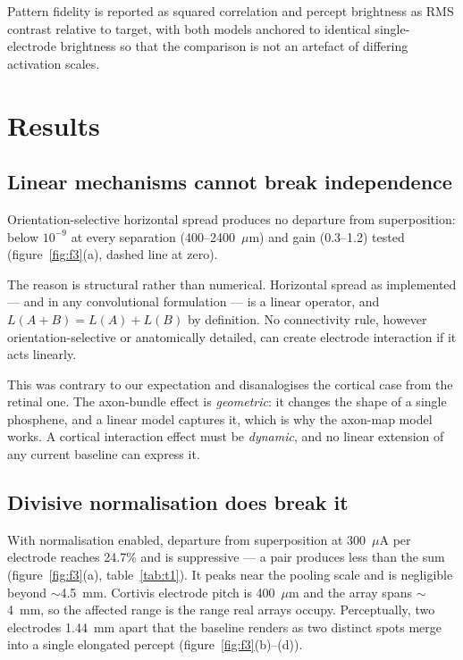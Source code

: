 \documentclass[10pt,twocolumn]{article}
\newcommand{\um}{\ensuremath{\mu\text{m}}}
\newcommand{\uA}{\ensuremath{\mu\text{A}}}
\begin{document}
Pattern fidelity is reported as squared correlation and percept brightness
as RMS contrast relative to target, with both models anchored to identical
single-electrode brightness so that the comparison is not an artefact of
differing activation scales.

\section{Results}

\subsection{Linear mechanisms cannot break independence}

Orientation-selective horizontal spread produces no departure from
superposition: below $10^{-9}$ at every separation (400--2400~\um) and gain
(0.3--1.2) tested (figure~\ref{fig:f3}(a), dashed line at zero).

The reason is structural rather than numerical. Horizontal spread as
implemented --- and in any convolutional formulation --- is a linear
operator, and $L(A+B) = L(A) + L(B)$ by definition. No connectivity rule,
however orientation-selective or anatomically detailed, can create electrode
interaction if it acts linearly.

This was contrary to our expectation and disanalogises the cortical case
from the retinal one. The axon-bundle effect is \textit{geometric}: it
changes the shape of a single phosphene, and a linear model captures it,
which is why the axon-map model works. A cortical interaction effect must be
\textit{dynamic}, and no linear extension of any current baseline can
express it.

\subsection{Divisive normalisation does break it}

With normalisation enabled, departure from superposition at 300~\uA{} per
electrode reaches 24.7\% and is suppressive --- a pair produces less than
the sum (figure~\ref{fig:f3}(a), table~\ref{tab:t1}). It peaks near the
pooling scale and is negligible beyond $\sim$4.5~mm. Cortivis electrode
pitch is 400~\um{} and the array spans $\sim$4~mm, so the affected range is
the range real arrays occupy. Perceptually, two electrodes 1.44~mm apart
that the baseline renders as two distinct spots merge into a single
elongated percept (figure~\ref{fig:f3}(b)--(d)).
\end{document}

